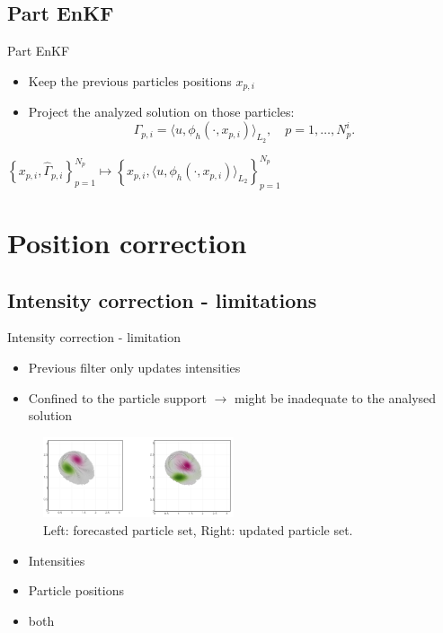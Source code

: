 \documentclass[aspectratio=169]{beamer} %
\begin{document}
\subsection{Part EnKF}
\begin{frame}{Part EnKF}
    \subtitle{Project solution on each forecast configuration}
    \begin{itemize}
        \item \normalsize Keep the previous particles positions $x_{p, i}$
        \item \normalsize Project the analyzed solution on those particles: \\
              \begin{equation*}
                  \Gamma_{p, i} = \langle u, \phi_h(\cdot,x_{p,i})\rangle_{L_2}, \quad p = 1, \dots, N_p^i.
              \end{equation*}
    \end{itemize}
    \vfill
    \centering
    $\left\{x_{p,i}, \hat \Gamma_{p,i}\right\}_{p=1}^{N_p} \mapsto \left\{x_{p,i}, \langle u, \phi_h(\cdot,x_{p,i})\rangle_{L_2} \right\}_{p=1}^{N_p}$
\end{frame}

\section{Position correction}
\subsection{Intensity correction - limitations}
\begin{frame}{Intensity correction - limitation}
    \begin{itemize}
        \item Previous filter only updates intensities
        \item Confined to the particle support $\rightarrow$ might be inadequate to the analysed solution

    \end{itemize}

    \begin{figure}
        \centering
        \includegraphics[width=0.5\textwidth]{images/unalign_discretization.png}
        \caption{Left: forecasted particle set, Right: updated particle set.}
    \end{figure}

    \begin{itemize}
        \item<2->Intensities
        \item<2-> \textcolor{ceared}{Particle positions}
        \item<2-> both
    \end{itemize}
\end{frame}
\end{document}
